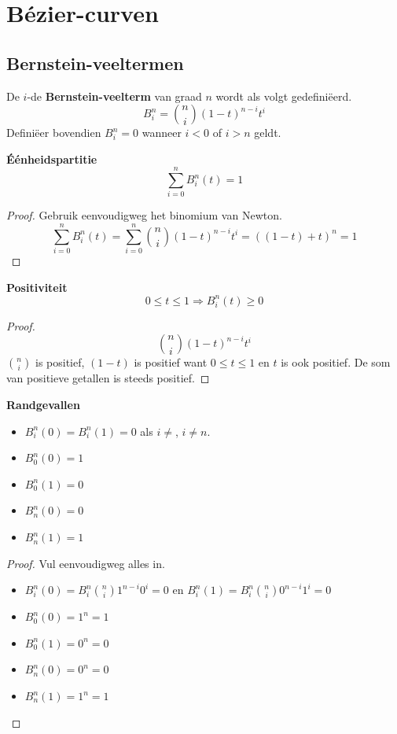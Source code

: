 \documentclass[computergesteund_ontwerp_van_curven_en_oppervlakken.tex]{subfiles}
\begin{document}
\chapter{B\'ezier-curven}
\section{Bernstein-veeltermen}
\begin{de}
\label{bern}
De $i$-de \textbf{Bernstein-veelterm} van graad $n$ wordt als volgt gedefini\"eerd.
\[
B_{i}^{n} = \binom{n}{i}(1-t)^{n-i}t^{i}
\]
Defini\"eer bovendien $B_{i}^{n} = 0$ wanneer $i < 0$ of $i > n$ geldt.
\end{de}

\begin{ei} \textbf{\'E\'enheidspartitie}
\label{bern_eenheidspartitie}
\[
\sum_{i=0}^nB_{i}^{n}(t) = 1
\]
\begin{proof}
Gebruik eenvoudigweg het binomium van Newton.
\[
\sum_{i=0}^nB_{i}^{n}(t)
= \sum_{i=0}^{n}\binom{n}{i}(1-t)^{n-i}t^i
= ((1-t)+t)^n
= 1
\]
\end{proof}
\end{ei}

\begin{ei} \textbf{Positiviteit}
\label{bern_positiviteit}
\[
0 \le t \le 1 \Rightarrow B_{i}^{n}(t) \ge 0
\]
\begin{proof}
\[
\binom{n}{i}(1-t)^{n-i}t^{i}
\]
$\binom{n}{i}$ is positief, $(1-t)$ is positief want $0 \le t \le 1$ en $t$ is ook positief. De som van positieve getallen is steeds positief.
\end{proof}
\end{ei}


\begin{ei} \textbf{Randgevallen}
\begin{itemize}
\item $B_{i}^{n}(0) = B_{i}^{n}(1) = 0$ als $i\neq$, $i\neq n$.
\item $B_{0}^{n}(0) = 1$
\item $B_{0}^{n}(1) = 0$
\item $B_{n}^{n}(0) = 0$
\item $B_{n}^{n}(1) = 1$
\end{itemize}
\begin{proof}
Vul eenvoudigweg alles in.
\begin{itemize}
\item $B_{i}^{n}(0) = B_{i}^{n}\binom{n}{i}1^{n-i}0^{i} = 0$ en $B_{i}^{n}(1) = B_{i}^{n}\binom{n}{i}0^{n-i}1^{i} = 0$
\item $B_{0}^{n}(0) = 1^{n} = 1$
\item $B_{0}^{n}(1) = 0^{n} = 0$

\item $B_{n}^{n}(0) = 0^{n} = 0$
\item $B_{n}^{n}(1) = 1^{n} = 1$
\end{itemize}
\end{proof}
\end{ei}
\end{document}

